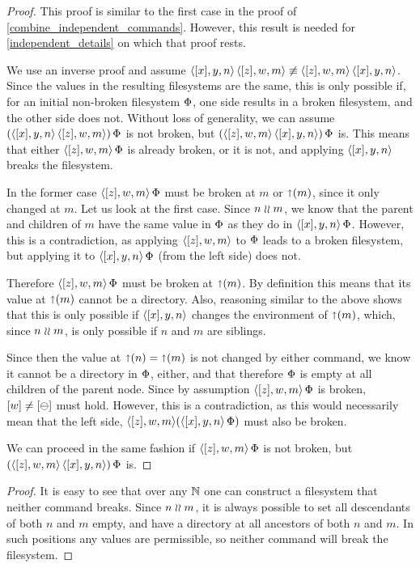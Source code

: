 \begin{proof}
This proof is similar to the first case in the proof of \cref{combine_independent_commands}.
However, this result is needed for \cref{independent_details} on which that proof rests.

We use an inverse proof and assume $\langle{[x],y,n}\rangle\,\langle{[z],w,m}\rangle \not\equiv \langle{[z],w,m}\rangle\,\langle{[x],y,n}\rangle$.
Since the values in the resulting filesystems are the same,
this is only possible if, for an initial non-broken filesystem $\Phi$,
one side results in a broken filesystem, and the other side does not.
Without loss of generality, we can assume
$(\langle{[x],y,n}\rangle\,\langle{[z],w,m}\rangle)\,\Phi$ is not broken, but $(\langle{[z],w,m}\rangle\,\langle{[x],y,n}\rangle)\,\Phi$ is.
This means that either $\langle{[z],w,m}\rangle\,\Phi$ is already broken, or it is not, and applying $\langle{[x],y,n}\rangle$
breaks the filesystem.

In the former case 
$\langle{[z],w,m}\rangle\,\Phi$ must be broken at $m$ or $\mathord{\shortuparrow}({m})$, since it only changed at $m$.
Let us look at the first case.
Since $n\mathrel{\wr\wr} m$, we know that the parent and children of $m$ have the same value
in $\Phi$ as they do in $\langle{[x],y,n}\rangle\,\Phi$. However, this is a contradiction,
as applying $\langle{[z],w,m}\rangle$ to $\Phi$ leads to a broken filesystem,
but applying it to $\langle{[x],y,n}\rangle\,\Phi$ (from the left side) does not.

Therefore $\langle{[z],w,m}\rangle\,\Phi$ must be broken at $\mathord{\shortuparrow}({m})$.
By definition this means that its value at $\mathord{\shortuparrow}({m})$ cannot be a directory.
Also, reasoning similar to the above shows that this is only possible if $\langle{[x],y,n}\rangle$ changes
the environment of $\mathord{\shortuparrow}({m})$, which, since $n\mathrel{\wr\wr} m$, is only possible
if $n$ and $m$ are siblings.

Since then the value at $\mathord{\shortuparrow}({n})=\mathord{\shortuparrow}({m})$ is not changed by either command,
we know it cannot be a directory in $\Phi$, either, and that therefore
$\Phi$ is empty at all children of the parent node.
Since by assumption $\langle{[z],w,m}\rangle\,\Phi$ is broken, $[w]\neq[\ominus]$ must hold.
However, this is a contradiction, as this would necessarily mean that
the left side, $\langle{[z],w,m}\rangle(\langle{[x],y,n}\rangle\,\Phi)$ must also be broken.

We can proceed in the same fashion if $\langle{[z],w,m}\rangle\,\Phi$ is not broken, but
$(\langle{[z],w,m}\rangle\,\langle{[x],y,n}\rangle)\,\Phi$ is.
\end{proof}

\begin{myaxproof}
\axaxseparatenobreaks
\end{myaxproof}

\begin{proof}
It is easy to see that over any $\mathbb{N}$ one can construct a filesystem that neither command breaks.
Since $n\mathrel{\wr\wr} m$, it is always possible to set all descendants of both $n$ and $m$ empty,
and have a directory at all ancestors of both $n$ and $m$. In such positions any values are permissible,
so neither command will break the filesystem.
\end{proof}

